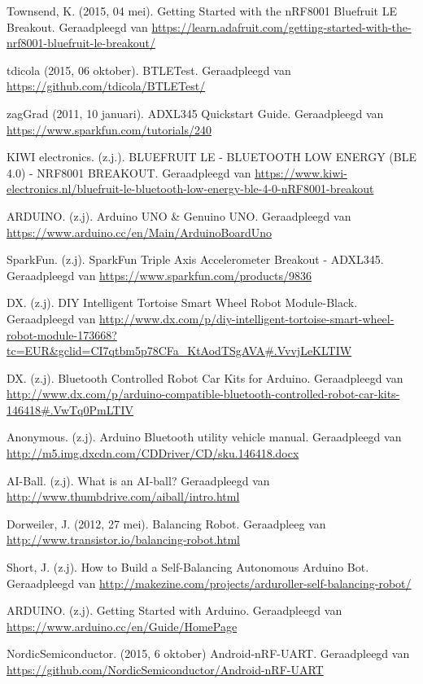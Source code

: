 \documentclass[12pt,a4paper]{article}
\begin{document}
\newpage
\begin{thebibliography}{9}
Townsend, K. (2015, 04 mei). Getting Started with the nRF8001 Bluefruit LE Breakout. 
Geraadpleegd van \url{https://learn.adafruit.com/getting-started-with-the-nrf8001-bluefruit-le-breakout/}

tdicola (2015, 06 oktober). BTLETest. Geraadpleegd van \url{https://github.com/tdicola/BTLETest/}

zagGrad (2011, 10 januari). ADXL345 Quickstart Guide. Geraadpleegd van \url{https://www.sparkfun.com/tutorials/240}

KIWI electronics. (z.j.). 
BLUEFRUIT LE - BLUETOOTH LOW ENERGY (BLE 4.0) - NRF8001 BREAKOUT. Geraadpleegd van \url{https://www.kiwi-electronics.nl/bluefruit-le-bluetooth-low-energy-ble-4-0-nRF8001-breakout}

ARDUINO. (z.j). Arduino UNO \& Genuino UNO. Geraadpleegd van \url{https://www.arduino.cc/en/Main/ArduinoBoardUno}

SparkFun. (z.j). SparkFun Triple Axis Accelerometer Breakout - ADXL345. Geraadpleegd van \url{https://www.sparkfun.com/products/9836}

DX. (z.j). DIY Intelligent Tortoise Smart Wheel Robot Module-Black. Geraadpleegd van 
\url{http://www.dx.com/p/diy-intelligent-tortoise-smart-wheel-robot-module-173668?tc=EUR&gclid=CI7qtbm5p78CFa_KtAodTSgAVA#.VvvjLeKLTIW}

DX. (z.j). Bluetooth Controlled Robot Car Kits for Arduino. Geraadpleegd van
\url{http://www.dx.com/p/arduino-compatible-bluetooth-controlled-robot-car-kits-146418#.VwTq0PmLTIV}

Anonymous. (z.j). Arduino Bluetooth utility vehicle manual. Geraadpleegd van
\url{http://m5.img.dxcdn.com/CDDriver/CD/sku.146418.docx}

AI-Ball. (z.j). What is an AI-ball? Geraadpleegd van
\url{http://www.thumbdrive.com/aiball/intro.html}

Dorweiler, J. (2012, 27 mei). Balancing Robot. Geraadpleeg van
\url{http://www.transistor.io/balancing-robot.html}

Short, J. (z.j). How to Build a Self-Balancing Autonomous Arduino Bot. Geraadpleegd van 
\url{http://makezine.com/projects/arduroller-self-balancing-robot/}

ARDUINO. (z.j). Getting Started with Arduino. Geraadpleegd van \url{https://www.arduino.cc/en/Guide/HomePage}

NordicSemiconductor. (2015, 6 oktober) Android-nRF-UART. Geraadpleegd van 
\url{https://github.com/NordicSemiconductor/Android-nRF-UART}

\end{thebibliography}
\end{document}
